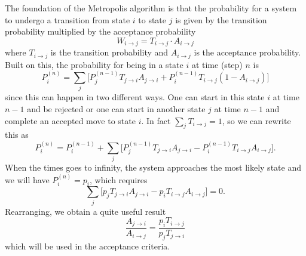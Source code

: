 \documentclass[norsk,a4paper,12pt]{article}
\begin{document}
The foundation of the Metropolis algorithm is that the probability for a system to undergo a transition from state $i$ to state $j$ is given by the transition probability multiplied by the acceptance probability
\begin{equation}
W_{i\rightarrow j} = T_{i \rightarrow j}\cdot A_{i \rightarrow j}
\end{equation}
where $T_{i \rightarrow j}$ is the transition probability and $A_{i \rightarrow j}$ is the acceptance probability. Built on this, the probability for being in a state $i$ at time (step) $n$ is
\begin{equation}
P_i^{(n)} = \sum_j\bigg[P_j^{(n-1)}T_{j \rightarrow i}A_{j \rightarrow i} + P_i^{(n-1)}T_{i \rightarrow j}(1-A_{i \rightarrow j})\bigg]
\end{equation}
since this can happen in two different ways. One can start in this state $i$ at time $n-1$ and be rejected or one can start in another state $j$ at time $n-1$ and complete an accepted move to state $i$. In fact $\sum_j T_{i \rightarrow j} =1$, so we can rewrite this as 
\begin{equation}
P_i^{(n)} = P_i^{(n-1)} + \sum_j\bigg[P_j^{(n-1)}T_{j \rightarrow i}A_{j \rightarrow i} - P_i^{(n-1)}T_{i \rightarrow j}A_{i \rightarrow j}\bigg].
\end{equation}
When the times goes to infinity, the system approaches the most likely state and we will have $P_i^{(n)} = p_i$, which requires
\begin{equation}
\sum_j\bigg[p_jT_{j \rightarrow i}A_{j \rightarrow i} - p_iT_{i \rightarrow j}A_{i \rightarrow j}\bigg]=0.
\end{equation}
Rearranging, we obtain a quite useful result
\begin{equation}
\frac{A_{j\rightarrow i}}{A_{i\rightarrow j}}=\frac{p_iT_{i\rightarrow j}}{p_jT_{j\rightarrow i}}
\end{equation}
which will be used in the acceptance criteria.
\end{document}

